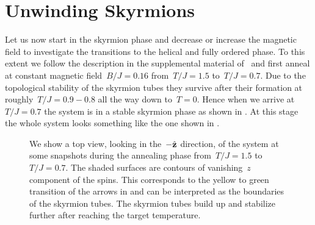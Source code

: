 \section{Unwinding Skyrmions}\label{sec:transitions}
%
Let us now start in the skyrmion phase and decrease or increase the magnetic
field to investigate the transitions to the helical and fully ordered phase. To
this extent we follow the description in the supplemental material
of~\cite{Milde} and first anneal at constant magnetic field~$B/J=0.16$
from~$T/J=1.5$ to~$T/J=0.7$. Due to the topological stability of the skyrmion
tubes they survive after their formation at roughly~$T/J = 0.9 - 0.8$ all the
way down to~$T=0$. Hence when we arrive at~$T/J=0.7$ the system is in a stable
skyrmion phase as shown in . At this stage the whole
system looks something like the one shown in .

\begin{figure}[H]
  \centering
  \caption{We show a top view, \ie{} looking in the~$-\hat{\mathbf{z}}$ direction, of the
  system at some snapshots during the annealing phase from~$T/J = 1.5$
  to~$T/J=0.7$. The shaded surfaces are contours of vanishing~$z$ component of
  the spins. This corresponds to the yellow to green transition of the arrows in
   and can be interpreted as the boundaries of the skyrmion
  tubes. The skyrmion tubes build up and stabilize further after reaching the
  target temperature.}
\label{fig:skyrmanneal}
\end{figure}


